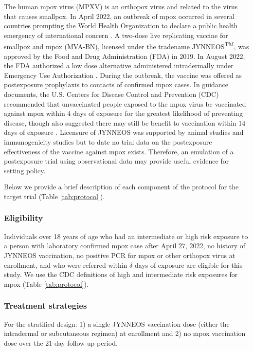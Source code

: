\documentclass[11pt]{article}
\begin{document}
The human mpox virus (MPXV) is an orthopox virus and related to the virus that causes smallpox. In April 2022, an outbreak of mpox occurred in several countries prompting the World Health Organization to declare a public health emergency of international concern \cite{nuzzo_who_2022}. A two-dose live replicating vaccine for smallpox and mpox (MVA-BN), licensed under the tradename JYNNEOS\textsuperscript{TM}, was approved by the Food and Drug Administration (FDA) in 2019. In August 2022, the FDA authorized a low dose alternative administered intradermally under Emergency Use Authorization \cite{united_states_food_and_drug_administration_monkeypox_2022}. During the outbreak, the vaccine was offered as postexposure prophylaxis to contacts of confirmed mpox cases. In guidance documents, the U.S. Centers for Disease Control and Prevention (CDC) recommended that unvaccinated people exposed to the mpox virus be vaccinated against mpox within 4 days of exposure for the greatest likelihood of preventing disease, though also suggested there may still be benefit to vaccination within 14 days of exposure \cite{kecmanovic1975einfluss,sommer_1972_1974}. Licensure of JYNNEOS was supported by animal studies \cite{earl_rapid_2008,keckler_effects_2013,hatch_assessment_2013,samuelsson_survival_2008} and immunogenicity studies \cite{pittman_phase_2019} but to date no trial data on the postexposure effectiveness of the vaccine against mpox exists. Therefore, an emulation of a postexposure trial using observational data may provide useful evidence for setting policy.

Below we provide a brief description of each component of the protocol for the target trial (Table \ref{tab:protocol}).

\subsubsection*{Eligibility}

Individuals over 18 years of age who had an intermediate or high risk exposure to a person with laboratory confirmed mpox case after April 27, 2022, no history of JYNNEOS vaccination, no positive PCR for mpox or other orthopox virus at enrollment, and who were referred within $\delta$ days of exposure are eligible for this study. We use the CDC definitions of high and intermediate risk exposures for mpox (Table \ref{tab:protocol}).

\subsubsection*{Treatment strategies}
For the stratified design: 1) a single JYNNEOS vaccination dose (either the intradermal or subcutaneous regimen) at enrollment and 2) no mpox vaccination dose over the 21-day follow up period. 
\end{document}
